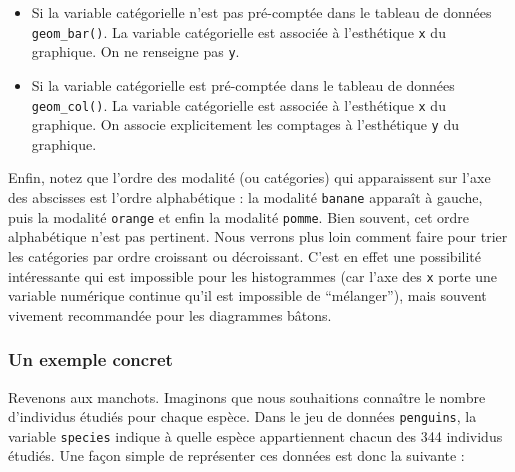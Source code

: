 \documentclass[
  a4paper,
  DIV=11,
  numbers=noendperiod,
  oneside]{scrreprt}
\providecommand{\tightlist}{%
  \setlength{\itemsep}{0pt}\setlength{\parskip}{0pt}}\usepackage{longtable,booktabs,array}
\begin{document}
\begin{tcolorbox}[enhanced jigsaw, coltitle=black, toprule=.15mm, opacityback=0, breakable, colback=white, opacitybacktitle=0.6, colframe=quarto-callout-important-color-frame, leftrule=.75mm, rightrule=.15mm, titlerule=0mm, bottomtitle=1mm, toptitle=1mm, arc=.35mm, title=\textcolor{quarto-callout-important-color}{\faExclamation}\hspace{0.5em}{Diagrammes bâtons}, colbacktitle=quarto-callout-important-color!10!white, bottomrule=.15mm, left=2mm]

\begin{itemize}
\tightlist
\item
  Si la variable catégorielle n'est pas pré-comptée dans le tableau de
  données  \texttt{geom\_bar()}. La variable
  catégorielle est associée à l'esthétique \texttt{x} du graphique. On
  ne renseigne pas \texttt{y}.
\item
  Si la variable catégorielle est pré-comptée dans le tableau de données
   \texttt{geom\_col()}. La variable catégorielle
  est associée à l'esthétique \texttt{x} du graphique. On associe
  explicitement les comptages à l'esthétique \texttt{y} du graphique.
\end{itemize}

\end{tcolorbox}

Enfin, notez que l'ordre des modalité (ou catégories) qui apparaissent
sur l'axe des abscisses est l'ordre alphabétique : la modalité
\texttt{banane} apparaît à gauche, puis la modalité \texttt{orange} et
enfin la modalité \texttt{pomme}. Bien souvent, cet ordre alphabétique
n'est pas pertinent. Nous verrons plus loin comment faire pour trier les
catégories par ordre croissant ou décroissant. C'est en effet une
possibilité intéressante qui est impossible pour les histogrammes (car
l'axe des \texttt{x} porte une variable numérique continue qu'il est
impossible de ``mélanger''), mais souvent vivement recommandée pour les
diagrammes bâtons.

\subsubsection{Un exemple concret}\label{un-exemple-concret}

Revenons aux manchots. Imaginons que nous souhaitions connaître le
nombre d'individus étudiés pour chaque espèce. Dans le jeu de données
\texttt{penguins}, la variable \texttt{species} indique à quelle espèce
appartiennent chacun des 344 individus étudiés. Une façon simple de
représenter ces données est donc la suivante :
\end{document}
